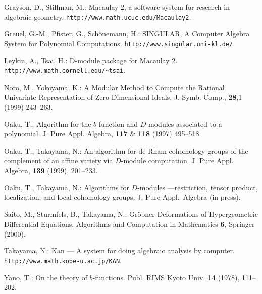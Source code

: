 \documentclass{jarticle}
\begin{document}
\begin{thebibliography}{99}

 Grayson, D., Stillman, M.:
Macaulay 2, a software system for research in algebraic geometry.
{\tt http://www.math.ucuc.edu/Macaulay2}.

 Greuel, G.-M., Pfister, G., Sch\"onemann, H.:
SINGULAR, A Computer Algebra System for Polynomial Computations.
{\tt http://www.singular.uni-kl.de/}.

 Leykin, A., Tsai, H.:
D-module package for Macaulay 2.
{\tt http://www.math.cornell.edu/\verb+~+tsai}.

 Noro, M., Yokoyama, K.:
A Modular Method to Compute the Rational Univariate
Representation of Zero-Dimensional Ideals.
J. Symb. Comp., {\bf 28},1 (1999) 243--263.

 Oaku, T.:
Algorithm for the $b$-function and
$D$-modules associated to a polynomial. J. Pure Appl. Algebra, {\bf
117} \& {\bf 118} (1997) 495--518.

 Oaku, T., Takayama, N.:
An algorithm for de Rham cohomology groups of the
complement of an affine variety via $D$-module computation. 
J. Pure Appl. Algebra, {\bf 139} (1999), 201--233.

 Oaku, T., Takayama, N.:
Algorithms for $D$-modules ---restriction, tensor product, 
localization, and local cohomology groups.  
J. Pure Appl.\ Algebra (in press).

Saito, M., Sturmfels, B., Takayama, N.:
Gr\"obner Deformations of Hypergeometric Differential Equations.
Algorithms and Computation in Mathematics {\bf 6}, Springer (2000).

 Takayama, N.:
Kan --- A system for doing algebraic analysis by computer.
{\tt http://www.math.kobe-u.ac.jp/KAN}.

 Yano, T.:
On the theory of $b$-functions.
Publ. RIMS Kyoto Univ. {\bf 14} (1978), 111--202.
\end{thebibliography}
\end{document}
